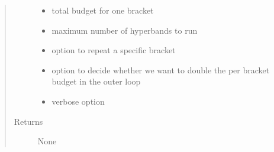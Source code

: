 \documentclass[letterpaper,10pt,english]{sphinxmanual}
\begin{document}
\begin{fulllineitems}
\begin{quote}
\begin{description}
\begin{itemize}
\item {} 
 \textendash{} total budget for one bracket

\item {} 
 \textendash{} maximum number of hyperbands to run

\item {} 
 \textendash{} option to repeat a specific bracket

\item {} 
 \textendash{} option to decide whether we want to double the per bracket budget in the outer loop

\item {} 
 \textendash{} verbose option

\end{itemize}

\item[{Returns}] \leavevmode
None

\end{description}\end{quote}

\end{fulllineitems}

\end{document}
